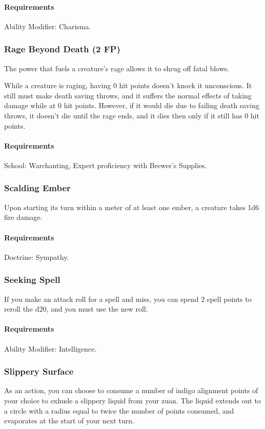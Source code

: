     \paragraph{Requirements} Ability Modifier: Charisma.
\subsubsection{Rage Beyond Death (2 FP)} \label{feat::ragebeyonddeath}
    The power that fuels a creature's rage allows it to shrug off fatal blows.

    While a creature is raging, having 0 hit points doesn't knock it unconscious.
    It still must make death saving throws, and it suffers the normal effects of taking damage while at 0 hit points.
    However, if it would die due to failing death saving throws, it doesn't die until the rage ends, and it dies then only if it still has 0 hit points.
    \paragraph{Requirements} School: Warchanting, Expert proficiency with Brewer's Supplies.
\subsubsection{Scalding Ember} \label{feat::scaldingember}
    Upon starting its turn within a meter of at least one ember, a creature takes 1d6 fire damage.
    \paragraph{Requirements} Doctrine: Sympathy.
\subsubsection{Seeking Spell} \label{feat::seekingspell}
    If you make an attack roll for a spell and miss, you can spend 2 spell points to reroll the d20, and you must use the new roll.
    \paragraph{Requirements} Ability Modifier: Intelligence.
\subsubsection{Slippery Surface} \label{feat::slipperysurface}
    As an action, you can choose to consume a number of indigo alignment points of your choice to exhude a slippery liquid from your zuan.
    The liquid extends out to a circle with a radius equal to twice the number of points consumed, and evaporates at the start of your next turn.

